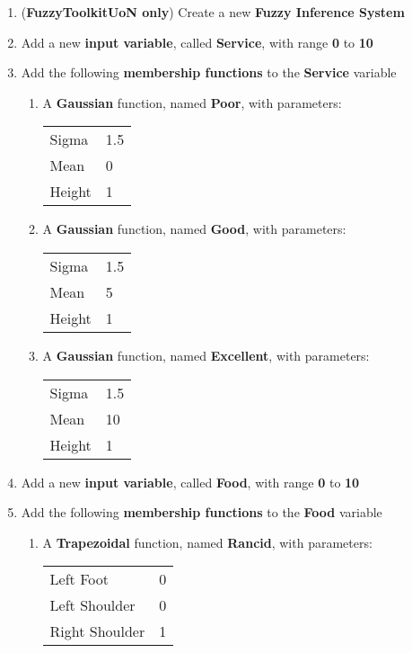 \begin{enumerate}
\item (\textbf{FuzzyToolkitUoN only}) Create a new \textbf{Fuzzy Inference System}
\item Add a new \textbf{input variable}, called \textbf{Service}, with range \textbf{0} to \textbf{10}
\item Add the following \textbf{membership functions} to the \textbf{Service} variable
	\begin{enumerate}
	\item A \textbf{Gaussian} function, named \textbf{Poor}, with parameters:\\
	\begin{tabular}{ll}
	Sigma 	& 1.5 \\
	Mean	& 0   \\
	Height	& 1   \\
	\end{tabular}
	\item A \textbf{Gaussian} function, named \textbf{Good}, with parameters:\\
	\begin{tabular}{ll}
	Sigma 	& 1.5 \\
	Mean	& 5   \\
	Height	& 1   \\
	\end{tabular}	
	\item A \textbf{Gaussian} function, named \textbf{Excellent}, with parameters:\\
	\begin{tabular}{ll}
	Sigma 	& 1.5 \\
	Mean	& 10   \\
	Height	& 1   \\
	\end{tabular}	
	\end{enumerate}
\item Add a new \textbf{input variable}, called \textbf{Food}, with range \textbf{0} to \textbf{10}	
\item Add the following \textbf{membership functions} to the \textbf{Food} variable
	\begin{enumerate}
	\item A \textbf{Trapezoidal} function, named \textbf{Rancid}, with parameters:\\
	\begin{tabular}{ll}
	Left Foot 		& 0		\\
	Left Shoulder 	& 0		\\
	Right Shoulder 	& 1		\\

\end{tabular}
\end{enumerate}
\end{enumerate}
